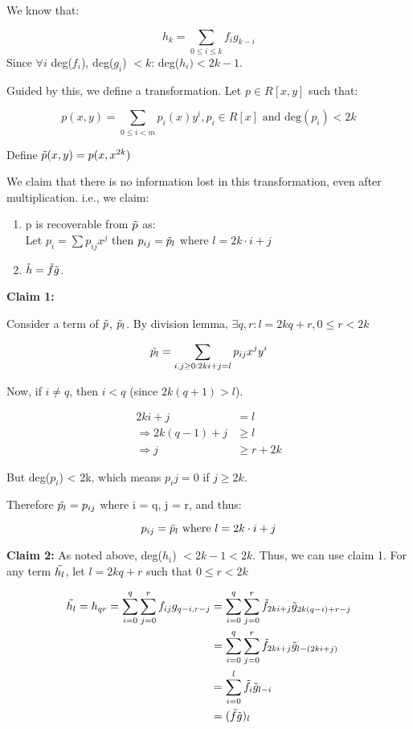 We know that:

\[
h_k = \sum_{0 \le i \le k} f_i g_{k-i} 
\]
Since $\forall i$ deg($f_i$), deg($g_i$) $< k$: deg($h_i) < 2k-1$. 



Guided by this, we define a transformation. Let $p \in R[x, y]$ such that:

\[
p(x, y) = \sum_{0 \le i < m} p_i(x) y^i, p_i \in R[x] \text{ and deg}(p_i) < 2k 
\]

Define $\Tilde{p}(x, y) = p(x, x^{2k})$

We claim that there is no information lost in this transformation, even after multiplication. i.e., we claim:

\begin{enumerate}
    \item p is recoverable from $\Tilde{p}$ as: \\
    Let $p_i = \sum p_{ij} x^j$ then
    $p_{ij} = \Tilde{p}_l$ where $l = 2k \cdot i + j$
    \item $\Tilde{h} = \Tilde{f} \Tilde{g}$.
\end{enumerate}

\textbf{Claim 1:} 

Consider a term of $\Tilde{p}$, $\Tilde{p}_l$. By division lemma, $\exists q,r: l = 2kq + r, 0 \le r < 2k$

\[
\Tilde{p_l} = \sum_{i,j \ge 0: 2ki+j = l} p_{ij} x^j y^i
\]

Now, if $i \ne q$, then $i < q$ (since $2k(q+1) > l$).

\begin{align*}
    2ki + j &= l \\
    \Rightarrow 2k(q-1) + j &\ge l \\
    \Rightarrow j &\ge r + 2k
\end{align*}

But deg($p_i$) < 2k, which means $p_ij = 0$ if $j \ge 2k$.

Therefore $\Tilde{p_l} = p_{ij}$ where i = q, j = r, and thus:

\[
p_{ij} = \Tilde{p}_l\text{ where }l = 2k \cdot i + j
\]

\textbf{Claim 2:}
As noted above, deg($h_i$) $< 2k-1 < 2k$. Thus, we can use claim 1.
For any term $\Tilde{h_l}$, let $l = 2kq+r$ such that $0 \le r < 2k$

\begin{align*}
    \Tilde{h_l} = h_{qr}
    = \sum_{i=0}^q \sum_{j=0}^r f_{ij} g_{q-i, r-j} &= \sum_{i=0}^q \sum_{j=0}^r \Tilde{f}_{2ki+j} \Tilde{g}_{2k(q-i)+r-j} \\
    &= \sum_{i=0}^q \sum_{j=0}^r \Tilde{f}_{2ki+j} \Tilde{g}_{l - (2ki+j)} \\
    &= \sum_{i=0}^l \Tilde{f}_i \Tilde{g}_{l-i} \\
    &= (\Tilde{f}\Tilde{g})_l
\end{align*}

